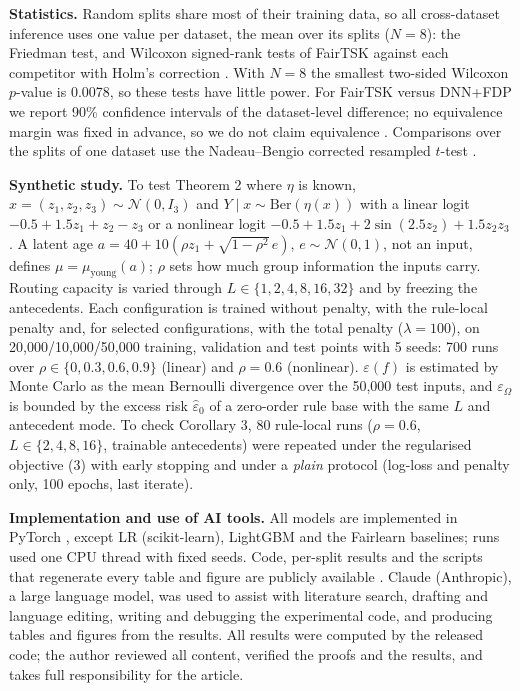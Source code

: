 \textbf{Statistics.} Random splits share most of their training data, so all cross-dataset inference uses one value per dataset, the mean over its splits (\(N = 8\)): the Friedman test, and Wilcoxon signed-rank tests of FairTSK against each competitor with Holm's correction \cite{demsar,holm}. With \(N = 8\) the smallest two-sided Wilcoxon \(p\)-value is 0.0078, so these tests have little power. For FairTSK versus DNN+FDP we report 90\% confidence intervals of the dataset-level difference; no equivalence margin was fixed in advance, so we do not claim equivalence \cite{schuirmann}. Comparisons over the splits of one dataset use the Nadeau--Bengio corrected resampled \(t\)-test \cite{nadeau}.

\textbf{Synthetic study.} To test Theorem 2 where \(\eta\) is known, \(x = (z_1,z_2,z_3) \sim \mathcal{N}(0,I_3)\) and \(Y \mid x \sim \mathrm{Ber}(\eta(x))\) with a linear logit \(-0.5 + 1.5z_1 + z_2 - z_3\) or a nonlinear logit \(-0.5 + 1.5z_1 + 2\sin(2.5z_2) + 1.5z_2z_3\). A latent age \(a = 40 + 10(\rho z_1 + \sqrt{1 - \rho^2}\,e)\), \(e \sim \mathcal{N}(0,1)\), not an input, defines \(\mu = \mu_{\text{young}}(a)\); \(\rho\) sets how much group information the inputs carry. Routing capacity is varied through \(L \in \{1,2,4,8,16,32\}\) and by freezing the antecedents. Each configuration is trained without penalty, with the rule-local penalty and, for selected configurations, with the total penalty (\(\lambda = 100\)), on 20,000/10,000/50,000 training, validation and test points with 5 seeds: 700 runs over \(\rho \in \{0,0.3,0.6,0.9\}\) (linear) and \(\rho = 0.6\) (nonlinear). \(\varepsilon(f)\) is estimated by Monte Carlo as the mean Bernoulli divergence over the 50,000 test inputs, and \(\varepsilon_\Omega\) is bounded by the excess risk \(\hat\varepsilon_0\) of a zero-order rule base with the same \(L\) and antecedent mode. To check Corollary 3, 80 rule-local runs (\(\rho = 0.6\), \(L \in \{2,4,8,16\}\), trainable antecedents) were repeated under the regularised objective (3) with early stopping and under a \emph{plain} protocol (log-loss and penalty only, 100 epochs, last iterate).

\textbf{Implementation and use of AI tools.} All models are implemented in PyTorch \cite{pytorch}, except LR (scikit-learn), LightGBM and the Fairlearn baselines; runs used one CPU thread with fixed seeds. Code, per-split results and the scripts that regenerate every table and figure are publicly available \cite{software}. Claude (Anthropic), a large language model, was used to assist with literature search, drafting and language editing, writing and debugging the experimental code, and producing tables and figures from the results. All results were computed by the released code; the author reviewed all content, verified the proofs and the results, and takes full responsibility for the article.

